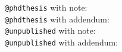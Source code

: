 \documentclass{article}
\begin{document}
	\noindent
	\verb|@phdthesis| with note: \cite{mephd2014}\\
	\verb|@phdthesis| with addendum: \cite{mepdh2014bis}\\
	\verb|@unpublished| with note: \cite{meunpub2014}\\
	\verb|@unpublished| with addendum: \cite{meunpub2014bis}
	\printbibliography
\end{document}
